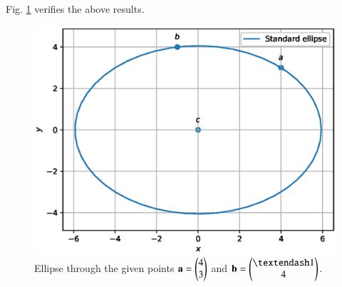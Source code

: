 \begin{enumerate}[label=\thesection.\arabic*.,ref=\thesection.\theenumi]
Fig. \ref{fig:ellipse_secant}	verifies the above results.
\begin{figure}[!ht]
\centering
\includegraphics[width=\columnwidth]{./figs/ellipse/ellipse_secant.eps}
\caption{Ellipse through the given points $\mathbf{a} = \begin{pmatrix}4\\3\end{pmatrix}$  and $\vec{b} = \myvec{– 1\\4}$.}
\label{fig:ellipse_secant}	
\end{figure}


\end{enumerate}
